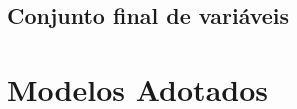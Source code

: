 
\subsection{Conjunto final de variáveis}
\label{subsec:conjunto_variaveis}



\section{Modelos Adotados}
\label{sec:modelos_adotados}


